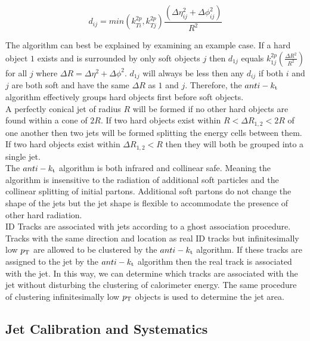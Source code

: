 \begin{equation}
d_{ij} = min ( k^{2p}_{Ti}, k^{2p}_{Tj} ) \frac{(\Delta\eta^2_{ij} + \Delta\phi^2_{ij})}{R^2}
\label{eqn:PileupDensity}
\end{equation}

\indent  The algorithm can best be explained by examining an example case.  If a hard object $1$ exists and is surrounded by only soft objects $j$ then $d_{1j}$ equals $k^{2p}_{1j}(\frac{\Delta R^2}{R^2})$ for all $j$ where $\Delta R = \Delta \eta^2 + \Delta \phi^2$.  $d_{1j}$ will always be less then any $d_{ij}$ if both $i$ and $j$ are both soft and have the same $\Delta R$ as $1$ and $j$.  Therefore, the $anti-k_{\rm{t}}$ algorithm effectively groups hard objects first before soft objects.  \\

\indent A perfectly conical jet of radius $R$ will be formed if no other hard objects are found within a cone of $2R$.  If two hard objects exist within $R<\Delta R_{1,2}<2R$ of one another then two jets will be formed splitting the energy cells between them.  If two hard objects exist within $\Delta R_{1,2}<R$ then they will both be grouped into a single jet. \\

\indent  The $anti-k_{\rm{t}}$ algorithm is both infrared and collinear safe.  Meaning the algorithm is insensitive to the radiation of additional soft particles and the collinear splitting of initial partons.  Additional soft partons do not change the shape of the jets but the jet shape is flexible to accommodate the presence of other hard radiation. \\

\indent ID Tracks are associated with jets according to a ghost association procedure.\cite{JetAreaGhostAssociate}  Tracks with the same direction and location as real ID tracks but infinitesimally low $p_{\mathrm{T}}$ are allowed to be clustered by the $anti-k_{\rm{t}}$ algorithm.  If these tracks are assigned to the jet by the $anti-k_{\rm{t}}$ algorithm then the real track is associated with the jet.  In this way, we can determine which tracks are associated with the jet without disturbing the clustering of calorimeter energy.  The same procedure of clustering infinitesimally low $p_{\mathrm{T}}$ objects is used to determine the jet area. \\

\subsection{Jet Calibration and Systematics}
\label{sec:jet:calib}

